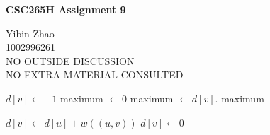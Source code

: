 \documentclass[10pt]{article}
\begin{document}
\begin{center}
{\bf \Large \bf CSC265H Assignment 9}
\end{center}

\noindent
Yibin Zhao\\
1002996261\\
NO OUTSIDE DISCUSSION\\
NO EXTRA MATERIAL CONSULTED\\

\begin{comment}
	Give an algorithm that, given a directed graph $G=(V,E)$ which contains no
	directed cycle and a weight function $w: E \rightarrow \mathbb{R}$, find
	a maximum weight path in $O(|V|+|E|)$ time.

	Prove that your algorithm is correct and has the required time complexity.
\end{comment}

\begin{algorithmic}[1]
			\State $d[v] \gets -1$
		\EndFor
		\State maximum $\gets 0$
				\State {}
					\State maximum $\gets d[v]$.
				\EndIf
			\EndIf
		\EndFor
		\Return maximum
	\EndFunction
\end{algorithmic}

\begin{algorithmic}[1]
				\State {}
			\EndIf
				\State $d[v] \gets d[u] + w((u,v))$ 
			\EndIf
		\EndFor
			\State $d[v] \gets 0$
		\EndIf
	\EndFunction
\end{algorithmic}
\end{document}
